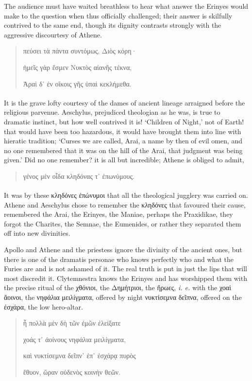 \documentclass[a4paper, 11pt, oneside, polutonikogreek, english]{article}
\begin{document}
The audience must have waited breathless to hear what answer the Erinyes would make to the question when thus officially challenged; their answer is skilfully contrived to the same end, though its dignity contrasts strongly with the aggressive discourtesy of Athene.
\begin{quotation}
πεύσει τὰ πάντα συντόμως, Διὸς κόρη·

ἡμεῖς γὰρ ἔσμεν Νυκτὸς αἰανῆς τέκνα,

Ἀραὶ δ᾽ ἐν οἴκοις γῆς ὑπαὶ κεκλήμεθα.
\end{quotation}
\paragraph{}
It is the grave lofty courtesy of the dames of ancient lineage arraigned before the religious parvenue. Aeschylus, prejudiced theologian as he was, is true to dramatic instinct, but how well contrived it is! `Children of Night,' not of Earth! that would have been too hazardous, it would have brought them into line with hieratic tradition; `Curses we are called, Arai, a name by then of evil omen, and no one remembered that it was on the hill of the Arai, that judgment was being given.' Did no one remember? it is all but incredible; Athene is obliged to admit,
\begin{quotation}
γένος μὲν οἷδα κληδόνας τ᾽ ἐπωνύμους.
\end{quotation}
\paragraph{}
It was by these κληδόνες ἐπώνυμοι that all the theological jugglery was carried on. Athene and Aeschylus chose to remember the κληδόνες that favoured their cause, remembered the Arai, the Erinyes, the Maniae, perhaps the Praxidikae, they forgot the Charites, the Semnae, the Eumenides, or rather they separated them off into new divinities.

Apollo and Athene and the priestess ignore the divinity of the ancient ones, but there is one of the dramatis personae who knows perfectly who and what the Furies are and is not ashamed of it. The real truth is put in just the lips that will most discredit it. Clytemnestra knows the Erinyes and has worshipped them with the precise ritual of the χθόνιοι, the Δημήτριοι, the ἥρωες, \emph{i. e.} with the χοαὶ ἄοινοι, the νηφάλια μειλίγματα, offered by night νυκτίσεμνα δεῖπνα, offered on the ἐσχάρα, the low hero-altar.
\begin{quotation}
ἦ πολλὰ μὲν δὴ τῶν ἐμῶν ἐλείξατε

χοάς τ᾽ ἀοίνους νηφάλια μειλίγματα,

καὶ νυκτίσεμνα δεῖπν᾽ ἐπ᾿ ἐσχάρᾳ πυρὸς

ἔθυον, ὥραν οὐδενὸς κοινὴν θεῶν.
\end{quotation}
\end{document}
